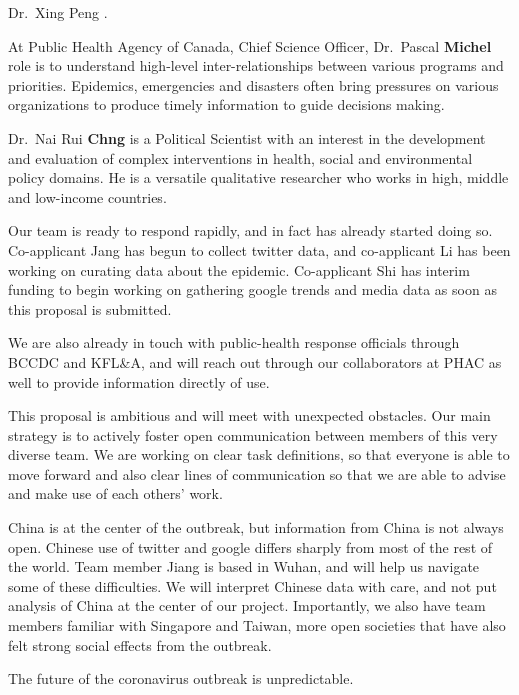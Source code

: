 Dr.\ Xing Peng  .

At Public Health Agency of Canada, Chief Science Officer, Dr.\ Pascal \textbf{Michel} role is to understand high-level inter-relationships between various programs and priorities. Epidemics, emergencies and disasters often bring pressures on various organizations to produce timely information to guide decisions making. 

Dr.\ Nai Rui \textbf{Chng} is a Political Scientist with an interest in the development and evaluation of complex interventions in health, social and environmental policy domains. He is a versatile qualitative researcher who works in high, middle and low-income countries.

Our team is ready to respond rapidly, and in fact has already started doing so. Co-applicant Jang has begun to collect twitter data, and co-applicant Li has been working on curating data about the epidemic. Co-applicant Shi has interim funding to begin working on gathering google trends and media data as soon as this proposal is submitted.

We are also already in touch with public-health response officials through BCCDC and KFL\&A, and will reach out through our collaborators at PHAC as well to provide information directly of use.


This proposal is ambitious and will meet with unexpected obstacles. Our main strategy is to actively foster open communication between members of this very diverse team. We are working on clear task definitions, so that everyone is able to move forward and also clear lines of communication so that we are able to advise and make use of each others' work.

China is at the center of the outbreak, but information from China is not always open. Chinese use of twitter and google differs sharply from most of the rest of the world. Team member Jiang is based in Wuhan, and will help us navigate some of these difficulties. We will interpret Chinese data with care, and not put analysis of China at the center of our project. Importantly, we also have team members familiar with Singapore and Taiwan, more open societies that have also felt strong social effects from the outbreak.

The future of the coronavirus outbreak is unpredictable. 
